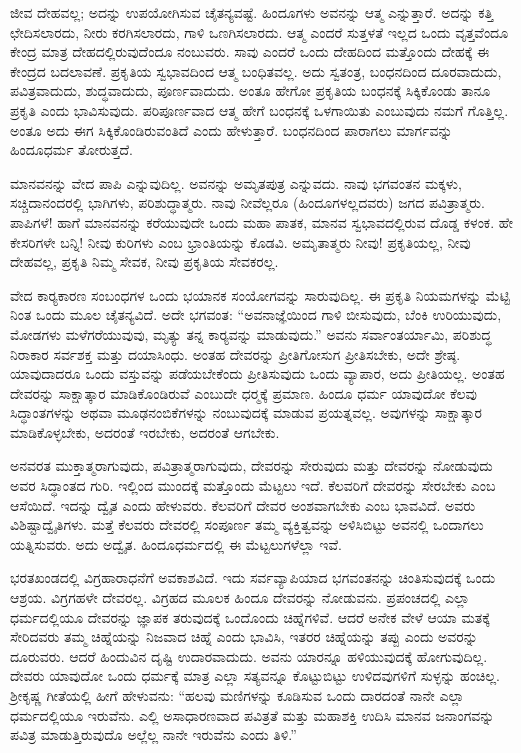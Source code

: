  ಜೀವ ದೇಹವಲ್ಲ; ಅದನ್ನು ಉಪಯೋಗಿಸುವ ಚೈತನ್ಯವಷ್ಟೆ. ಹಿಂದೂಗಳು ಅವನನ್ನು ಆತ್ಮ ಎನ್ನುತ್ತಾರೆ. ಅದನ್ನು ಕತ್ತಿ ಛೇದಿಸಲಾರದು, ನೀರು ಕರಗಿಸಲಾರದು, ಗಾಳಿ ಒಣಗಿಸಲಾರದು. ಆತ್ಮ ಎಂದರೆ ಸುತ್ತಳತೆ ಇಲ್ಲದ ಒಂದು ವೃತ್ತವೆಂದೂ ಕೇಂದ್ರ ಮಾತ್ರ ದೇಹದಲ್ಲಿರುವುದೆಂದೂ ನಂಬುವರು. ಸಾವು ಎಂದರೆ ಒಂದು ದೇಹದಿಂದ ಮತ್ತೊಂದು ದೇಹಕ್ಕೆ ಈ ಕೇಂದ್ರದ ಬದಲಾವಣೆ. ಪ್ರಕೃತಿಯ ಸ್ವಭಾವದಿಂದ ಆತ್ಮ ಬಂಧಿತವಲ್ಲ. ಅದು ಸ್ವತಂತ್ರ, ಬಂಧನದಿಂದ ದೂರವಾದುದು, ಪವಿತ್ರವಾದುದು, ಶುದ್ಧವಾದುದು, ಪೂರ್ಣವಾದುದು. ಅಂತೂ ಹೇಗೋ ಪ್ರಕೃತಿಯ ಬಂಧನಕ್ಕೆ ಸಿಕ್ಕಿಕೊಂಡು ತಾನೂ ಪ್ರಕೃತಿ ಎಂದು ಭಾವಿಸುವುದು. ಪರಿಪೂರ್ಣವಾದ ಆತ್ಮ ಹೇಗೆ ಬಂಧನಕ್ಕೆ ಒಳಗಾಯಿತು ಎಂಬುವುದು ನಮಗೆ ಗೊತ್ತಿಲ್ಲ. ಅಂತೂ ಅದು ಈಗ ಸಿಕ್ಕಿಕೊಂಡಿರುವಂತಿದೆ ಎಂದು ಹೇಳುತ್ತಾರೆ. ಬಂಧನದಿಂದ ಪಾರಾಗಲು ಮಾರ್ಗವನ್ನು ಹಿಂದೂಧರ್ಮ ತೋರುತ್ತದೆ. 

 ಮಾನವನನ್ನು ವೇದ ಪಾಪಿ ಎನ್ನುವುದಿಲ್ಲ. ಅವನನ್ನು ಅಮೃತಪುತ್ರ ಎನ್ನುವದು. ನಾವು ಭಗವಂತನ ಮಕ್ಕಳು, ಸಚ್ಚಿದಾನಂದರಲ್ಲಿ ಭಾಗಿಗಳು, ಪರಿಶುದ್ಧಾತ್ಮರು. ನಾವು ನೀವೆಲ್ಲರೂ (ಹಿಂದೂಗಳಲ್ಲದವರು) ಜಗದ ಪವಿತ್ರಾತ್ಮರು. ಪಾಪಿಗಳೆ! ಹಾಗೆ ಮಾನವನನ್ನು ಕರೆಯುವುದೇ ಒಂದು ಮಹಾ ಪಾತಕ, ಮಾನವ ಸ್ವಭಾವದಲ್ಲಿರುವ ದೊಡ್ಡ ಕಳಂಕ. ಹೇ ಕೇಸರಿಗಳೇ ಬನ್ನಿ! ನೀವು ಕುರಿಗಳು ಎಂಬ ಭ್ರಾಂತಿಯನ್ನು ಕೊಡವಿ. ಅಮೃತಾತ್ಮರು ನೀವು! ಪ್ರಕೃತಿಯಲ್ಲ, ನೀವು ದೇಹವಲ್ಲ, ಪ್ರಕೃತಿ ನಿಮ್ಮ ಸೇವಕ, ನೀವು ಪ್ರಕೃತಿಯ ಸೇವಕರಲ್ಲ. 

 ವೇದ ಕಾರ‍್ಯಕಾರಣ ಸಂಬಂಧಗಳ ಒಂದು ಭಯಾನಕ ಸಂಯೋಗವನ್ನು ಸಾರುವುದಿಲ್ಲ. ಈ ಪ್ರಕೃತಿ ನಿಯಮಗಳನ್ನು ಮೆಟ್ಟಿ ನಿಂತ ಒಂದು ಮೂಲ ಚೈತನ್ಯವಿದೆ. ಅದೇ ಭಗವಂತ: “ಅವನಾಜ್ಞೆಯಿಂದ ಗಾಳಿ ಬೀಸುವುದು, ಬೆಂಕಿ ಉರಿಯುವುದು, ಮೋಡಗಳು ಮಳೆಗರೆಯುವುವು, ಮೃತ್ಯು ತನ್ನ ಕಾರ‍್ಯವನ್ನು ಮಾಡುವುದು.” ಅವನು ಸರ್ವಾಂತರ್ಯಾಮಿ, ಪರಿಶುದ್ಧ ನಿರಾಕಾರ ಸರ್ವಶಕ್ತ ಮತ್ತು ದಯಾಸಿಂಧು. ಅಂತಹ ದೇವರನ್ನು ಪ್ರೀತಿಗೋಸುಗ ಪ್ರೀತಿಸಬೇಕು, ಅದೇ ಶ್ರೇಷ್ಠ. ಯಾವುದಾದರೂ ಒಂದು ವಸ್ತುವನ್ನು ಪಡೆಯಬೇಕೆಂದು ಪ್ರೀತಿಸುವುದು ಒಂದು ವ್ಯಾಪಾರ, ಅದು ಪ್ರೀತಿಯಲ್ಲ. ಅಂತಹ ದೇವರನ್ನು ಸಾಕ್ಷಾತ್ಕಾರ ಮಾಡಿಕೊಂಡಿರುವೆ ಎಂಬುದೇ ಧರ‍್ಮಕ್ಕೆ ಪ್ರಮಾಣ. ಹಿಂದೂ ಧರ್ಮ ಯಾವುದೋ ಕೆಲವು ಸಿದ್ಧಾಂತಗಳನ್ನು ಅಥವಾ ಮೂಢನಂಬಿಕೆಗಳನ್ನು ನಂಬುವುದಕ್ಕೆ ಮಾಡುವ ಪ್ರಯತ್ನವಲ್ಲ. ಅವುಗಳನ್ನು ಸಾಕ್ಷಾತ್ಕಾರ ಮಾಡಿಕೊಳ್ಳಬೇಕು, ಅದರಂತೆ ಇರಬೇಕು, ಅದರಂತೆ ಆಗಬೇಕು. 

 ಅನವರತ ಮುಕ್ತಾತ್ಮರಾಗುವುದು, ಪವಿತ್ರಾತ್ಮರಾಗುವುದು, ದೇವರನ್ನು ಸೇರುವುದು ಮತ್ತು ದೇವರನ್ನು ನೋಡುವುದು ಅವರ ಸಿದ್ಧಾಂತದ ಗುರಿ. ಇಲ್ಲಿಂದ ಮುಂದಕ್ಕೆ ಮತ್ತೊಂದು ಮೆಟ್ಟಲು ಇದೆ. ಕೆಲವರಿಗೆ ದೇವರನ್ನು ಸೇರಬೇಕು ಎಂಬ ಆಸೆಯಿದೆ. ಇದನ್ನು ದ್ವೈತ ಎಂದು ಹೇಳುವರು. ಕೆಲವರಿಗೆ ದೇವರ ಅಂಶವಾಗಬೇಕು ಎಂಬ ಭಾವವಿದೆ. ಅವರು ವಿಶಿಷ್ಟಾದ್ವೈತಿಗಳು. ಮತ್ತೆ ಕೆಲವರು ದೇವರಲ್ಲಿ ಸಂಪೂರ್ಣ ತಮ್ಮ ವ್ಯಕ್ತಿತ್ವವನ್ನು ಅಳಿಸಿಬಿಟ್ಟು ಅವನಲ್ಲಿ ಒಂದಾಗಲು ಯತ್ನಿಸುವರು. ಅದು ಅದ್ವೈತ. ಹಿಂದೂಧರ್ಮದಲ್ಲಿ ಈ ಮೆಟ್ಟಲುಗಳೆಲ್ಲಾ ಇವೆ. 

 ಭರತಖಂಡದಲ್ಲಿ ವಿಗ್ರಹಾರಾಧನೆಗೆ ಅವಕಾಶವಿದೆ. ಇದು ಸರ್ವವ್ಯಾಪಿಯಾದ ಭಗವಂತನನ್ನು ಚಿಂತಿಸುವುದಕ್ಕೆ ಒಂದು ಆಶ್ರಯ. ವಿಗ್ರಗಹಳೇ ದೇವರಲ್ಲ. ವಿಗ್ರಹದ ಮೂಲಕ ಹಿಂದೂ ದೇವರನ್ನು ನೋಡುವನು. ಪ್ರಪಂಚದಲ್ಲಿ ಎಲ್ಲಾ ಧರ್ಮದಲ್ಲಿಯೂ ದೇವರನ್ನು ಜ್ಞಾಪಕ ತರುವುದಕ್ಕೆ ಒಂದೊಂದು ಚಿಹ್ನೆಗಳಿವೆ. ಆದರೆ ಅನೇಕ ವೇಳೆ ಆಯಾ ಮತಕ್ಕೆ ಸೇರಿದವರು ತಮ್ಮ ಚಿಹ್ನೆಯನ್ನು ನಿಜವಾದ ಚಿಹ್ನೆ ಎಂದು ಭಾವಿಸಿ, ಇತರರ ಚಿಹ್ನೆಯನ್ನು ತಪ್ಪು ಎಂದು ಅವರನ್ನು ದೂರುವರು. ಆದರೆ ಹಿಂದುವಿನ ದೃಷ್ಟಿ ಉದಾರವಾದುದು. ಅವನು ಯಾರನ್ನೂ ಹಳಿಯುವುದಕ್ಕೆ ಹೋಗುವುದಿಲ್ಲ. ದೇವರು ಯಾವುದೋ ಒಂದು ಧರ್ಮಕ್ಕೆ ಮಾತ್ರ ಎಲ್ಲಾ ಸತ್ಯವನ್ನೂ ಕೊಟ್ಟುಬಿಟ್ಟು ಉಳಿದವುಗಳಿಗೆ ಸುಳ್ಳನ್ನು ಹಂಚಿಲ್ಲ. ಶ‍್ರೀಕೃಷ್ಣ ಗೀತೆಯಲ್ಲಿ ಹೀಗೆ ಹೇಳುವನು: “ಹಲವು ಮಣಿಗಳನ್ನು ಕೂಡಿಸುವ ಒಂದು ದಾರದಂತೆ ನಾನೇ ಎಲ್ಲಾ ಧರ್ಮದಲ್ಲಿಯೂ ಇರುವೆನು. ಎಲ್ಲಿ ಅಸಾಧಾರಣವಾದ ಪವಿತ್ರತೆ ಮತ್ತು ಮಹಾಶಕ್ತಿ ಉದಿಸಿ ಮಾನವ ಜನಾಂಗವನ್ನು ಪವಿತ್ರ ಮಾಡುತ್ತಿರುವುದೊ ಅಲ್ಲೆಲ್ಲ ನಾನೇ ಇರುವೆನು ಎಂದು ತಿಳಿ.” 

